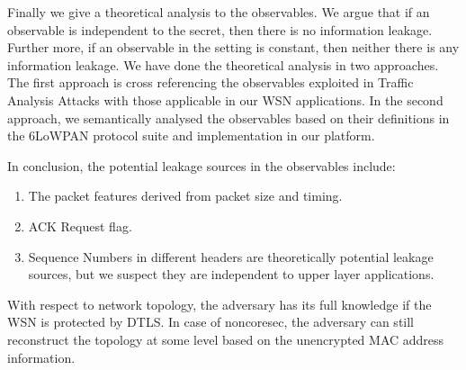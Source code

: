 Finally we give a theoretical analysis to the observables. We argue that if an observable is independent to the secret, then there is no information leakage. Further more, if an observable in the setting is constant, then neither there is any information leakage. We have done the theoretical analysis in two approaches. The first approach is cross referencing the observables exploited in Traffic Analysis Attacks with those applicable in our WSN applications. In the second approach, we semantically analysed the observables based on their definitions in the 6LoWPAN protocol suite and implementation in our platform. 

In conclusion, the potential leakage sources in the observables include:
\begin{enumerate}
	\item The packet features derived from packet size and timing.
	\item ACK Request flag.
	\item Sequence Numbers in different headers are theoretically potential leakage sources, but we suspect they are independent to upper layer applications.
\end{enumerate}

With respect to network topology, the adversary has its full knowledge if the WSN is protected by DTLS. In case of noncoresec, the adversary can still reconstruct the topology at some level based on the unencrypted MAC address information. 